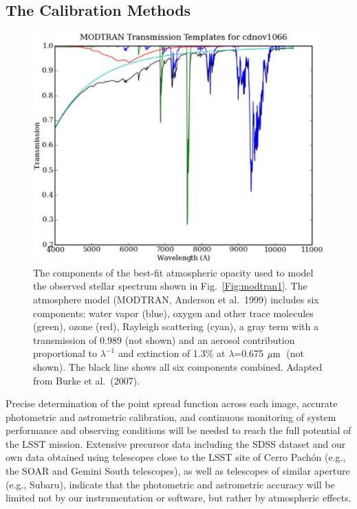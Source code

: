 \documentclass{emulateapj}
\def\mic              {\hbox{$\mu{\rm m}$}}
\begin{document}
\newpage
\subsection{ The Calibration Methods }



\begin{figure}
\includegraphics[width=1.0\hsize,clip]{modtran2.pdf}
\caption{The components of the best-fit atmospheric opacity used to
model the observed stellar spectrum shown in Fig.~\ref{Fig:modtran1}.
The atmosphere model (MODTRAN, Anderson et al.~1999) includes six
components: water vapor (blue), oxygen and other trace molecules
(green), ozone (red), Rayleigh scattering (cyan), a gray term
with a transmission of 0.989 (not shown) and an aerosol contribution
proportional to $\lambda^{-1}$ and extinction of 1.3\% at $\lambda$=0.675 \mic\
(not shown). The black line shows all six components combined.
Adapted from Burke et al.~(2007).}
\label{Fig:modtran2}
\end{figure}


Precise determination of the point spread function across each image, 
accurate photometric and astrometric calibration, and continuous monitoring 
of system performance and observing conditions will be needed to reach the 
full potential of the LSST mission. Extensive precursor data including the 
SDSS dataset and our own data obtained using telescopes close to 
the LSST site of Cerro Pach\'{o}n (e.g., the SOAR and Gemini South telescopes), 
as well as telescopes of similar aperture (e.g., Subaru), indicate that the 
photometric and astrometric accuracy will be limited not by our instrumentation 
or software, but rather by atmospheric effects. 
\end{document}
